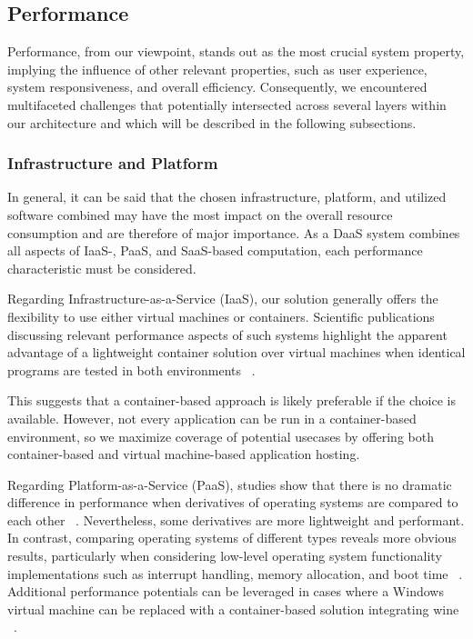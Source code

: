 \documentclass[runningheads]{llncs}
\begin{document}
\subsection{Performance}
Performance, from our viewpoint, stands out as the most crucial system property,
implying the influence of other  relevant properties,
such as user experience, system responsiveness, and overall efficiency.
Consequently, we encountered multifaceted challenges
that potentially intersected across several layers within our architecture
and which will be described in the following subsections.

\subsubsection{Infrastructure and Platform}
In general, it can be said that the chosen infrastructure, platform,
and utilized software combined may have the most impact on the overall resource consumption
and are therefore of major importance.
As a DaaS system combines all aspects of IaaS-, PaaS, and SaaS-based computation, each performance characteristic must be considered.

Regarding Infrastructure-as-a-Service (IaaS),
our solution generally offers the flexibility
to use either virtual machines or containers.
Scientific publications discussing relevant performance aspects of such systems
highlight the apparent advantage of a lightweight container solution
over virtual machines when identical programs are tested in both environments
~\cite{felter2015updated,potdar2020performance}.

This suggests that a container-based approach is likely preferable
if the choice is available.
However, not every application can be run
in a container-based environment,
so we maximize coverage of potential usecases
by offering both container-based and virtual machine-based application hosting.

Regarding Platform-as-a-Service (PaaS),
studies show that there is no dramatic difference in performance
when derivatives of operating systems are compared to each other
~\cite{balen2020performance,boras2020performance}.
Nevertheless, some derivatives are more lightweight and performant.
In contrast, comparing operating systems of different types
reveals more obvious results, particularly when considering
low-level operating system functionality implementations
such as interrupt handling, memory allocation, and boot time
~\cite{sulaiman2021comparison}.
Additional performance potentials can be leveraged
in cases where a Windows virtual machine can be replaced
with a container-based solution integrating wine
~\cite{huang2012performance}.
\end{document}
